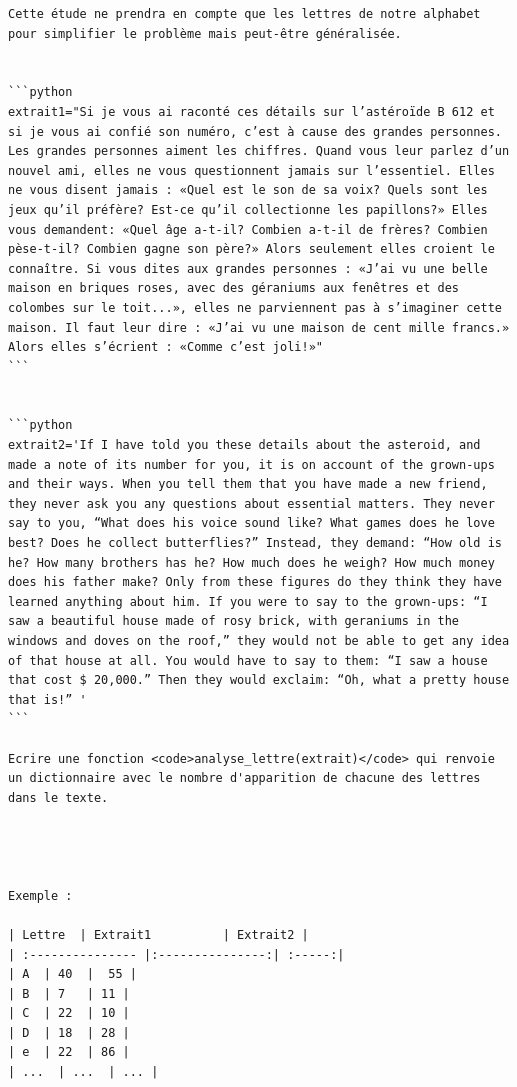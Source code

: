 \documentclass[
]{article}
\begin{document}
\begin{verbatim}
Cette étude ne prendra en compte que les lettres de notre alphabet pour simplifier le problème mais peut-être généralisée.


```python
extrait1="Si je vous ai raconté ces détails sur l’astéroïde B 612 et si je vous ai confié son numéro, c’est à cause des grandes personnes. Les grandes personnes aiment les chiffres. Quand vous leur parlez d’un nouvel ami, elles ne vous questionnent jamais sur l’essentiel. Elles ne vous disent jamais : «Quel est le son de sa voix? Quels sont les jeux qu’il préfère? Est-ce qu’il collectionne les papillons?» Elles vous demandent: «Quel âge a-t-il? Combien a-t-il de frères? Combien pèse-t-il? Combien gagne son père?» Alors seulement elles croient le connaître. Si vous dites aux grandes personnes : «J’ai vu une belle maison en briques roses, avec des géraniums aux fenêtres et des colombes sur le toit...», elles ne parviennent pas à s’imaginer cette maison. Il faut leur dire : «J’ai vu une maison de cent mille francs.» Alors elles s’écrient : «Comme c’est joli!»"
```


```python
extrait2='If I have told you these details about the asteroid, and made a note of its number for you, it is on account of the grown-ups and their ways. When you tell them that you have made a new friend, they never ask you any questions about essential matters. They never say to you, “What does his voice sound like? What games does he love best? Does he collect butterflies?” Instead, they demand: “How old is he? How many brothers has he? How much does he weigh? How much money does his father make? Only from these figures do they think they have learned anything about him. If you were to say to the grown-ups: “I saw a beautiful house made of rosy brick, with geraniums in the windows and doves on the roof,” they would not be able to get any idea of that house at all. You would have to say to them: “I saw a house that cost $ 20,000.” Then they would exclaim: “Oh, what a pretty house that is!” '
```

Ecrire une fonction <code>analyse_lettre(extrait)</code> qui renvoie un dictionnaire avec le nombre d'apparition de chacune des lettres dans le texte.




Exemple :  

| Lettre  | Extrait1          | Extrait2 |  
| :--------------- |:---------------:| :-----:|  
| A  | 40  |  55 |  
| B  | 7   | 11 |  
| C  | 22  | 10 |  
| D  | 18  | 28 |  
| e  | 22  | 86 |  
| ...  | ...  | ... |  


\end{verbatim}
\end{document}
